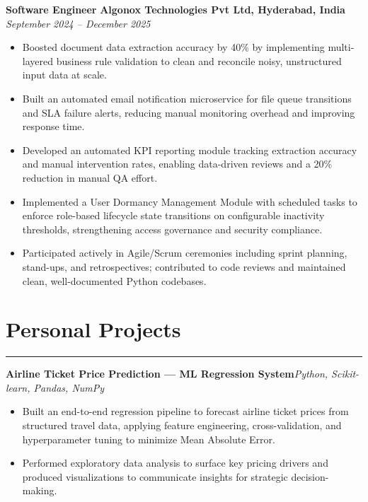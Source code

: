 \documentclass[12pt]{article}
\newenvironment{project}[2]
  {\par\textbf{#1}\hfill\textit{#2}\vspace{1pt}\begin{itemize}}
  {\end{itemize}\vspace{2pt}}
\begin{document}
\newpage
\textbf{Software Engineer} \hfill \textbf{Algonox Technologies Pvt Ltd, Hyderabad, India} \\
\textit{September 2024 -- December 2025}
\begin{itemize}
  \item Boosted document data extraction accuracy by 40\% by implementing multi-layered business rule validation to clean and reconcile noisy, unstructured input data at scale.
  \item Built an automated email notification microservice for file queue transitions and SLA failure alerts, reducing manual monitoring overhead and improving response time.
  \item Developed an automated KPI reporting module tracking extraction accuracy and manual intervention rates, enabling data-driven reviews and a 20\% reduction in manual QA effort.
  \item Implemented a User Dormancy Management Module with scheduled tasks to enforce role-based lifecycle state transitions on configurable inactivity thresholds, strengthening access governance and security compliance.
  \item Participated actively in Agile/Scrum ceremonies including sprint planning, stand-ups, and retrospectives; contributed to code reviews and maintained clean, well-documented Python codebases.
\end{itemize}

\section*{Personal Projects}
\vspace{1pt}\hrule\vspace{4pt}

\begin{project}{Airline Ticket Price Prediction — ML Regression System}{Python, Scikit-learn, Pandas, NumPy}
  \item Built an end-to-end regression pipeline to forecast airline ticket prices from structured travel data, applying feature engineering, cross-validation, and hyperparameter tuning to minimize Mean Absolute Error.
  \item Performed exploratory data analysis to surface key pricing drivers and produced visualizations to communicate insights for strategic decision-making.
\end{project}

\end{document}
